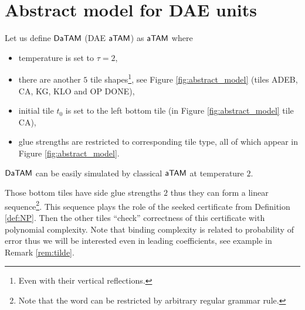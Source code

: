 \section{Abstract model for DAE units}

\begin{defn}
	Let us define $\mathsf{DaTAM}$ (DAE $\mathsf{aTAM}$) as $\mathsf{aTAM}$ where
	\begin{itemize}
		\item temperature is set to $\tau = 2$,
		\item there are another $5$ tile shapes\footnote{Even with their vertical reflections.}, see Figure \ref{fig:abstract_model} (tiles {\sf ADEB}, {\sf CA}, {\sf KG}, {\sf KLO} and {\sf OP DONE}),
		\item initial tile $t_0$ is set to the left bottom tile (in Figure \ref{fig:abstract_model} tile {\sf CA}),
		\item glue strengths are restricted to corresponding tile type, all of which appear in Figure \ref{fig:abstract_model}.
	\end{itemize}
\end{defn}

\begin{note}
	$\mathsf{DaTAM}$ can be easily simulated by classical $\mathsf{aTAM}$ at temperature $2$.
\end{note}

Those bottom tiles have side glue strengths $2$ thus they can form a linear sequence\footnote{Note that the word can be restricted by arbitrary regular grammar rule.}. This sequence plays the role of the seeked certificate from Definition \ref{def:NP}. Then the other tiles ``check'' correctness of this certificate with polynomial complexity. Note that binding complexity is related to probability of error thus we will be interested even in leading coefficients, see example in Remark \ref{rem:tilde}.


